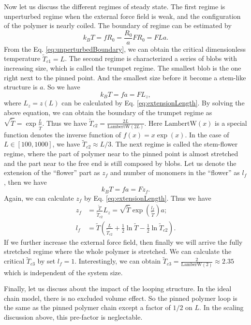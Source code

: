 Now let us discuss the different regimes of steady state. The first regime is unperturbed regime when the external force field is weak, and the configuration of the polymer is nearly coiled. The boundary of regime can be estimated by 
\begin{equation}
    \label{eq:unperturbedBoundary}
    k_B T = f R_0 = \frac{R_0}{a} F R_0 = F L a.
\end{equation}
From the Eq. \eqref{eq:unperturbedBoundary}, we can obtain the critical dimensionless temperature $\tilde{T}_{c1} = L$. The second regime is characterized a series of blobs with increasing size, which is called the trumpet regime.
The smallest blob is the one right next to the pinned point. And the smallest size before it become a stem-like structure is $a$. So we have
\begin{equation}
    \label{eq:trumpetBoundary}
    k_B T = f a = F L_z,
\end{equation}
where $L_z = z(L)$ can be calculated by Eq. \eqref{eq:extensionLength}. By solving the above equation, we can obtain the boundary of the trumpet regime as $ \sqrt{\tilde{T}} = \exp{\frac{L}{\tilde{T}}}$. Thus we have $\tilde{T}_{c2} = \frac{2L}{\text{LambertW}(2L)}$. Here $\text{LambertW}(x)$ is a special function denotes the inverse function of $f(x) = x \exp(x)$. In the case of $L\in[100, 1000]$, we have $\tilde{T}_{c2} \approx L / 3$. 
The next regime is called the stem-flower regime, where the part of polymer near to the pinned point is almost stretched and the part near to the free end is still composed by blobs. Let us denote the extension of the ``flower'' part as $z_f$ and number of monomers in the ``flower'' as $l_f$, then we have
\begin{equation}
    k_B T = f a = F z_f.
\end{equation}
Again, we can calculate $z_f$ by Eq. \eqref{eq:extensionLength}. Thus we have 
\begin{subequations}
    \label{eq:flowerSize}
    \begin{align}
        z_f  & = \frac{\tilde{T}}{\tilde{T}_{c2}} L_z = \sqrt{\tilde{T}}\exp\left(\frac{l_f}{\tilde{T}}\right) a; \\
        l_f  & = \tilde{T}\left(\frac{L}{\tilde{T}_{c2}} + \frac{1}{2} \ln\tilde{T} - \frac{1}{2}\ln\tilde{T}_{c2}\right).
    \end{align}
\end{subequations}
If we further increase the external force field, then finally we will arrive the fully stretched regime where the whole polymer is stretched. We can calculate the critical $\tilde{T}_{c3}$ by set $l_f = 1$. Interestingly, we can obtain $\tilde{T}_{c3} = \frac{2}{\text{LamberW}(2)} \approx 2.35$ which is independent of the system size. 

Finally, let us discuss about the impact of the looping structure. In the ideal chain model, there is no excluded volume effect. So the pinned polymer loop is the same as the pinned polymer chain except a factor of $1/2$ on $L$. In the scaling discussion above, this pre-factor is neglectable. 

